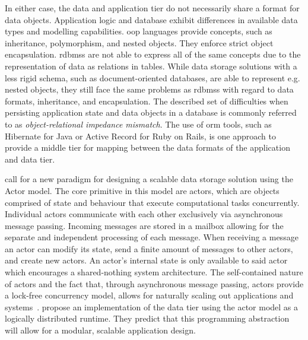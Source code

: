   In either case, the data and application tier do not necessarily share a format for data objects.
  Application logic and database exhibit differences in available data types and modelling capabilities.
  \Gls{oop} languages provide concepts, such as inheritance, polymorphism, and nested objects.
  They enforce strict object encapsulation.
  \Glspl{rdbms} are not able to express all of the same concepts due to the representation of data as relations in tables. %
  While data storage solutions with a less rigid schema, such as document-oriented databases, are able to represent e.g. nested objects, they still face the same problems as \glspl{rdbms} with regard to data formats, inheritance, and encapsulation.
  The described set of difficulties when persisting application state and data objects in a database is commonly referred to as \textit{object-relational impedance mismatch}.
  The use of \gls{orm} tools, such as Hibernate for Java or Active Record for Ruby on Rails, is one approach to provide a middle tier for mapping between the data formats of the application and data tier.

   call for a new paradigm for designing a scalable data storage solution using the Actor model.
  The core primitive in this model are actors, which are objects comprised of state and behaviour that execute computational tasks concurrently.
  Individual actors communicate with each other exclusively via asynchronous message passing.
  Incoming messages are stored in a mailbox allowing for the separate and independent processing of each message.
  When receiving a message an actor can modify its state, send a finite amount of messages to other actors, and create new actors.
  An actor's internal state is only available to said actor which encourages a shared-nothing system architecture.
  The self-contained nature of actors and the fact that, through asynchronous message passing, actors provide a lock-free concurrency model, allows for naturally scaling out applications and systems~\cite{vernon2015reactive}.
   propose an implementation of the data tier using the actor model as a logically distributed runtime.
  They predict that this programming abstraction will allow for a modular, scalable application design.

